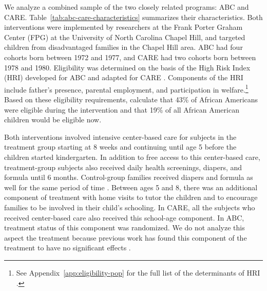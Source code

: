 We analyze a combined sample of the two closely related programs: ABC and CARE. Table~\ref{tab:abc-care-characteristics} summarizes their characteristics. Both interventions were implemented by researchers at the Frank Porter Graham Center (FPG) at the University of North Carolina Chapel Hill, and targeted children from disadvantaged families in the Chapel Hill area. ABC had four cohorts born between 1972 and 1977, and CARE had two cohorts born between 1978 and 1980. Eligibility was determined on the basis of the High Risk Index (HRI) developed for ABC and adapted for CARE \citep{Ramey_Smith_1977_AJMD,Wasik_Ramey_etal_1990_CD}. Components of the HRI include father's presence, parental employment, and participation in welfare.\footnote{See Appendix~\ref{app:eligibility-pop} for the full list of the determinants of HRI \citep{Ramey_Smith_1977_AJMD, Wasik_Ramey_etal_1990_CD, Ramey_Campbell_1991_childreninpoverty}.} Based on these eligibility requirements, \citet{Garcia_Heckman_Leaf_etal_2017_Comp_CBA_Unpublished} calculate that 43\% of African Americans were eligible during the intervention and that 19\% of all African American children would be eligible now.

Both interventions involved intensive center-based care for subjects in the treatment group starting at 8 weeks and continuing until age 5 before the children started kindergarten. In addition to free access to this center-based care, treatment-group subjects also received daily health screenings, diapers, and formula until 6 months. Control-group families received diapers and formula as well for the same period of time \citep{Wasik_Ramey_etal_1990_CD,Ramey_Campbell_1991_childreninpoverty}. Between ages 5 and 8, there was an additional component of treatment with home visits to tutor the children and to encourage families to be involved in their child's schooling. In CARE, all the subjects who received center-based care also received this school-age component. In ABC, treatment status of this component was randomized. We do not analyze this aspect the treatment because previous work has found this component of the treatment to have no significant effects \citep{Campbell_Ramey_etal_2002_ADS,Campbell_Conti_etal_2014_EarlyChildhoodInvestments}.

